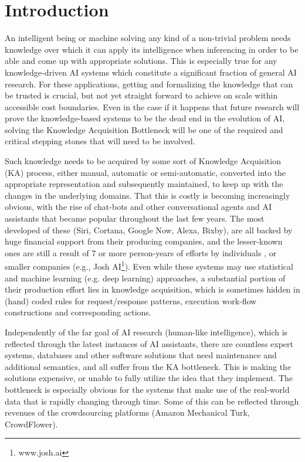 % 
\chapter{Introduction}
An intelligent being or machine solving any kind of a non-trivial problem needs
knowledge over which it can apply its intelligence when inferencing in order to
be able and come up with appropriate solutions. This is especially true for any 
knowledge-driven AI systems which constitute a significant fraction of general 
AI research. For these applications, getting and formalizing the knowledge that
can be trusted is crucial, but not yet straight forward to achieve on scale 
within accessible cost boundaries. Even in the case if it happens that future 
research will prove the knowledge-based systems to be the dead end in the
evolution of AI, solving the Knowledge Acquisition 
Bottleneck \parencite{Wagner2006} will be one of the required and critical 
stepping stones that will need to be involved.

Such knowledge needs to be acquired by some sort of Knowledge Acquisition (KA) 
process, either manual, automatic or semi-automatic, converted into the
appropriate representation and subsequently maintained, to keep up with the
changes in the underlying domains. That this is costly is becoming 
increasingly obvious, with the rise of chat-bots and other conversational 
agents and AI assistants that became popular throughout the last few years. 
The most developed of these (Siri, Cortana, Google Now, Alexa, Bixby), are 
all backed by huge financial support from their producing companies, and the 
lesser-known ones are still a result of 7 or more person-years of efforts by
individuals \parencite{Wilcox2011, Wallace2013}, or smaller companies (e.g.,
Josh AI\footnote{www.josh.ai}). Even while these systems may use statistical
and machine learning (e.g. deep learning) approaches, a substantial 
portion of their production effort lies in knowledge acquisition, which is 
sometimes hidden in (hand) coded rules for request/response patterns, execution
work-flow constructions and corresponding actions.

Independently of the far goal of AI research (human-like intelligence), which
is reflected through the latest instances of AI assistants, there are countless 
expert systems, databases and other software solutions that need maintenance
and additional semantics, and all suffer from the KA bottleneck. This is making
the solutions expensive, or unable to fully utilize the idea that they 
implement. The bottleneck is especially obvious for the systems that make use 
of the real-world data that is rapidly changing through time. Some of this can
be reflected through revenues of the crowdsourcing platforms (Amazon Mechanical
Turk, CrowdFlower).

